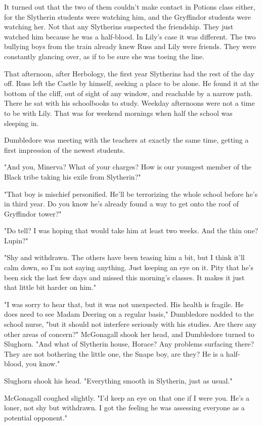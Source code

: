 It turned out that the two of them couldn't make contact in Potions class either, for the Slytherin students were watching him, and the Gryffindor students were watching her. Not that any Slytherins suspected the friendship. They just watched him because he was a half-blood. In Lily's case it was different. The two bullying boys from the train already knew Russ and Lily were friends. They were constantly glancing over, as if to be sure she was toeing the line.

That afternoon, after Herbology, the first year Slytherins had the rest of the day off. Russ left the Castle by himself, seeking a place to be alone. He found it at the bottom of the cliff, out of sight of any window, and reachable by a narrow path. There he sat with his schoolbooks to study. Weekday afternoons were not a time to be with Lily. That was for weekend mornings when half the school was sleeping in.

Dumbledore was meeting with the teachers at exactly the same time, getting a first impression of the newest students.

"And you, Minerva? What of your charges? How is our youngest member of the Black tribe taking his exile from Slytherin?"

"That boy is mischief personified. He'll be terrorizing the whole school before he's in third year. Do you know he's already found a way to get onto the roof of Gryffindor tower?"

"Do tell? I was hoping that would take him at least two weeks. And the thin one? Lupin?"

"Shy and withdrawn. The others have been teasing him a bit, but I think it'll calm down, so I'm not saying anything. Just keeping an eye on it. Pity that he's been sick the last few days and missed this morning's classes. It makes it just that little bit harder on him."

"I was sorry to hear that, but it was not unexpected. His health is fragile. He does need to see Madam Deering on a regular basis," Dumbledore nodded to the school nurse, "but it should not interfere seriously with his studies. Are there any other areas of concern?" McGonagall shook her head, and Dumbledore turned to Slughorn. "And what of Slytherin house, Horace? Any problems surfacing there? They are not bothering the little one, the Snape boy, are they? He is a half-blood, you know."

Slughorn shook his head. "Everything smooth in Slytherin, just as usual."

McGonagall coughed slightly. "I'd keep an eye on that one if I were you. He's a loner, not shy but withdrawn. I got the feeling he was assessing everyone as a potential opponent."

